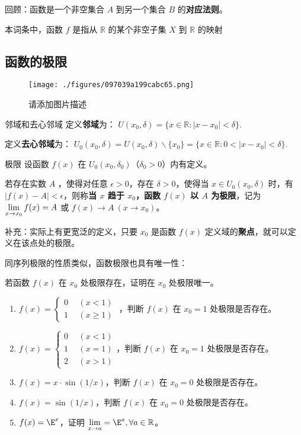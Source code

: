

回顾：函数是一个非空集合 $A$ 到另一个集合 $B$ 的\textbf{对应法则}。

本词条中，函数 $f$ 是指从 $\mathbb R$ 的某个非空子集 $X$ 到 $\mathbb{R}$ 的映射  

\subsection{函数的极限}
\begin{figure}[ht]
\centering
\texttt{[image: ./figures/097039a199cabc65.png]}
\caption{请添加图片描述} \label{fig_limfx_1}
\end{figure}
\begin{definition}{邻域和去心邻域}
定义\textbf{邻域}为： $U(x_0,\delta)=\{x\in \mathbb{R}:|x-x_0|<\delta\}$.

定义\textbf{去心邻域}为： $U_0(x_0,\delta)= U(x_0,\delta) \backslash \{x_0\}=\{x\in \mathbb{R}:0<|x-x_0|<\delta\}$.
\end{definition}
\begin{definition}{极限}
 设函数 $f(x)$ 在 $U_0(x_0,\delta_0)$（$\delta_0>0$）内有定义。

  若存在实数 $A$ ，使得对任意 $\epsilon >0$，存在 $\delta>0$，使得当 $x\in U_0(x_0,\delta)$ 时，有 $|f(x)-A|<\epsilon$，则称\textbf{当 $x$ 趋于 $x_0$，函数 $f(x)$ 以 $A$ 为极限}，记为 $\large \lim\limits_{x\rightarrow x_0}f(x)=A$ 或 $f(x)\rightarrow A\ (x\rightarrow x_0)$。
\end{definition}
补充：实际上有更宽泛的定义，只要 $x_0$ 是函数 $f(x)$ 定义域的\textbf{聚点}，就可以定义在该点处的极限。

同序列极限的性质类似，函数极限也具有唯一性：
\begin{theorem}{}
  若函数 $f(x)$ 在 $x_0$ 处极限存在，证明在 $x_0$ 处极限唯一。
\end{theorem}
\begin{exercise}{}
\begin{enumerate}
\item  $f(x)=\left\{\begin{aligned} 0\ \ &(x<1)\\ 1\ \ &(x\ge 1) \end{aligned}\right.$ ，判断 $f(x)$ 在 $x_0=1$ 处极限是否存在。
\item $f(x)=\left\{\begin{aligned} 0\ \ &(x<1)\\ 1\ \ &(x= 1)\\2\ \ &(x>1) \end{aligned}\right.$，判断 $f(x)$ 在 $x_0=1$ 处极限是否存在。
\item $f(x)=x\cdot \sin(1/x)$，判断 $f(x)$ 在 $x_0=0$ 处极限是否存在。
\item $f(x)=\sin(1/x)$，判断 $f(x)$ 在 $x_0=0$ 处极限是否存在。
\item $f(x)=\E^x$，证明 $\lim\limits_{x\rightarrow a}=\E^a,\forall a\in\mathbb{R}$。
\end{enumerate}
\end{exercise}

